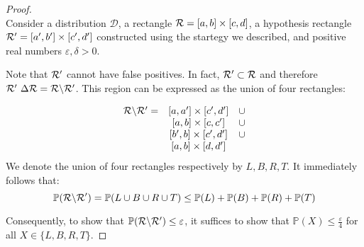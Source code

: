 \begin{proof}
    \ \\
    Consider a distribution \(\mathcal{D}\), a rectangle \(\mathcal{R} = [a, b]\times[c, d]\), a hypothesis rectangle \(\mathcal{R}^\prime = [a^\prime, b^\prime] \times [c^\prime, d^\prime]\) constructed using the startegy we described, and positive real numbers \(\varepsilon, \delta>0\).

    Note that \(\mathcal{R}^\prime\) cannot have false positives. In fact, \(\mathcal{R}^\prime\subset\mathcal{R}\) and therefore \(\mathcal{R}^\prime~\Delta\mathcal{R} = \mathcal{R}\backslash\mathcal{R}^\prime\). 
    This region can be expressed as the union of four rectangles: 

    \[
        \begin{array}{ccc}
            \mathcal{R}\backslash\mathcal{R}^\prime = & [a, a^\prime] \times [c^\prime, d^\prime]& \cup\\
                & [a, b] \times [c, c^\prime] & \cup\\
                & [b^\prime, b] \times [c^\prime, d^\prime] & \cup\\
                & [a, b] \times [d, d^\prime]
        \end{array}
    \]
    We denote the union of four rectangles respectively by \(L, B, R, T\). It immediately follows that:
    \[
        \mathbb{P}(\mathcal{R}\backslash\mathcal{R}^\prime) = \mathbb{P}(L \cup B \cup R \cup T) \le \mathbb{P}(L) + \mathbb{P}(B) + \mathbb{P}(R) + \mathbb{P}(T)    
    \]
    
    Consequently, to show that \(\mathbb{P}(\mathcal{R}\backslash\mathcal{R}^\prime) \le \varepsilon\), it suffices to show that \(\mathbb{P}(X) \le \frac{\varepsilon}{4}\) for all \(X\in\{L, B, R, T\}\).

\end{proof}